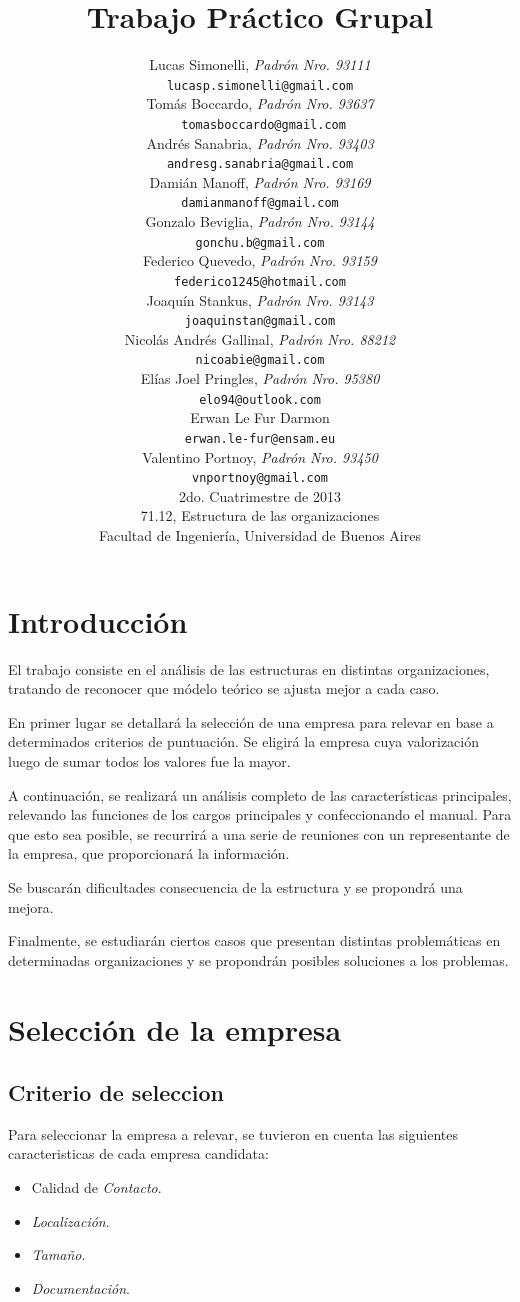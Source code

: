 \documentclass[a4paper,10pt]{article}
\title{		\textbf{Trabajo Práctico Grupal}}
\author{	Lucas Simonelli, \textit{Padrón Nro. 93111}                     \\
            \texttt{ lucasp.simonelli@gmail.com }                                              \\[2.5ex]
            Tomás Boccardo, \textit{Padrón Nro. 93637}                     \\
            \texttt{ tomasboccardo@gmail.com}                                              \\[2.5ex]
            Andrés Sanabria, \textit{Padrón Nro. 93403}                     \\
            \texttt{ andresg.sanabria@gmail.com  }                                              \\[2.5ex]
            Damián Manoff, \textit{Padrón Nro. 93169}                     \\
            \texttt{ damianmanoff@gmail.com  }                                              \\[2.5ex]
            Gonzalo Beviglia, \textit{Padrón Nro. 93144}                     \\
            \texttt{ gonchu.b@gmail.com  }                                              \\[2.5ex]
            Federico Quevedo, \textit{Padrón Nro. 93159}                     \\
            \texttt{ federico1245@hotmail.com  }                                              \\[2.5ex]
            Joaquín Stankus, \textit{Padrón Nro. 93143}                     \\
            \texttt{ joaquinstan@gmail.com  }                                              \\[2.5ex]
            Nicolás Andrés Gallinal, \textit{Padrón Nro. 88212}                \\
            \texttt{ nicoabie@gmail.com }                                              \\[2.5ex]
            Elías Joel Pringles, \textit{Padrón Nro. 95380}                \\
            \texttt{ elo94@outlook.com }                                              \\[2.5ex]   
          Erwan Le Fur Darmon								               \\
            \texttt{ erwan.le-fur@ensam.eu }                                              \\[2.5ex]   
Valentino Portnoy, \textit{Padrón Nro. 93450}                     \\
            \texttt{ vnportnoy@gmail.com  }                                              \\[2.5ex]
            \normalsize{2do. Cuatrimestre de 2013}                                      \\
            \normalsize{71.12, Estructura de las organizaciones}  \\
            \normalsize{Facultad de Ingeniería, Universidad de Buenos Aires}            \\
       }
\date{}
\begin{document}
\maketitle
\thispagestyle{empty}   %


\newpage
\tableofcontents
\newpage
\section{Introducción}
El trabajo consiste en el análisis de las estructuras en distintas organizaciones, tratando de reconocer que módelo teórico se ajusta mejor a cada caso.

En primer lugar se detallará la selección de una empresa para relevar en base a determinados criterios de puntuación. Se eligirá la empresa cuya valorización luego de sumar todos los valores fue la mayor.

A continuación, se realizará un análisis completo de las características principales, relevando las funciones de los cargos principales y confeccionando el manual. Para que esto sea posible, se recurrirá a una serie de reuniones con un representante de la empresa, que proporcionará la información.

Se buscarán dificultades consecuencia de la estructura y se propondrá una mejora.

Finalmente, se estudiarán ciertos casos que presentan distintas problemáticas en determinadas organizaciones y se propondrán posibles soluciones a los problemas.

\newpage
\section{Selección de la empresa}

\subsection{Criterio de seleccion}

Para seleccionar la empresa a relevar, se tuvieron en cuenta las siguientes caracteristicas de cada empresa candidata:

\begin{itemize}
\item Calidad de \emph{Contacto}. 
\item \emph{Localización}.
\item \emph{Tamaño}.
\item \emph{Documentación}. 
\end{itemize}
\end{document}
